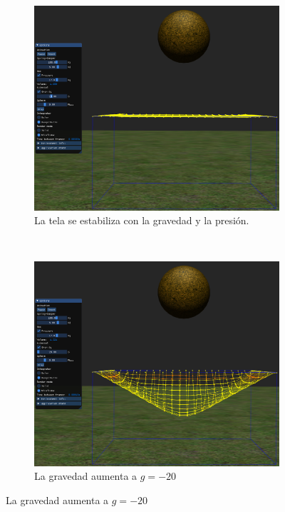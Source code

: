 \begin{figure}
 \centering
  \begin{subfigure}[b]{0.45\textwidth}
    \includegraphics[width=\textwidth]{Img/04/gravity1}
    \caption{La tela se estabiliza con la gravedad y la presión.}
    \label{fig:testGEstable}
  \end{subfigure}
~
  \begin{subfigure}[b]{0.45\textwidth}
    \includegraphics[width=\textwidth]{Img/04/gravity2}
    \caption{La gravedad aumenta a $g=-20$}
    \label{fig:testGAumenta}

\end{subfigure}
\end{figure}
